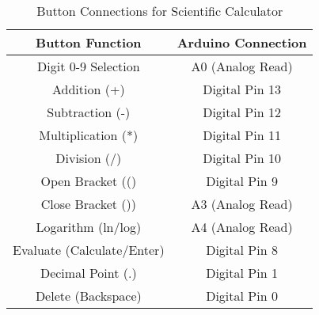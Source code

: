 \begin{table}[h!]
    \centering
    \begin{tabular}{|c|c|}
        \hline
        \textbf{Button Function} & \textbf{Arduino Connection} \\
        \hline
        Digit 0-9 Selection & A0 (Analog Read) \\
        \hline
        Addition (+) & Digital Pin 13 \\
        \hline
        Subtraction (-) & Digital Pin 12 \\
        \hline
        Multiplication (*) & Digital Pin 11 \\
        \hline
        Division (/) & Digital Pin 10 \\
        \hline
        Open Bracket (() & Digital Pin 9 \\
        \hline
        Close Bracket ()) & A3 (Analog Read) \\
        \hline
        Logarithm (ln/log) & A4 (Analog Read) \\
        \hline
        Evaluate (Calculate/Enter) & Digital Pin 8 \\
        \hline
        Decimal Point (.) & Digital Pin 1 \\
        \hline
        Delete (Backspace) & Digital Pin 0 \\
        \hline
    \end{tabular}
    \caption{Button Connections for Scientific Calculator}
    \label{tab:button_connections}
\end{table}
